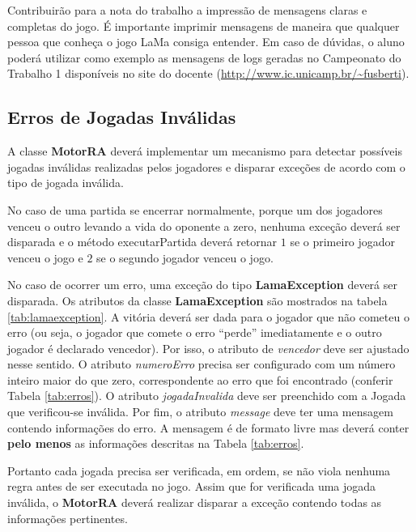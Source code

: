 \documentclass[10pt]{article}
\begin{document}
Contribuirão para a nota do trabalho a impressão de mensagens claras e completas do jogo. É importante imprimir mensagens de maneira que qualquer pessoa que conheça o jogo LaMa consiga entender. Em caso de dúvidas, o aluno poderá utilizar como exemplo as mensagens de logs geradas no Campeonato do Trabalho 1 disponíveis no site do docente (\url{http://www.ic.unicamp.br/~fusberti}).

\subsection{Erros de Jogadas Inválidas} \label{sec:excecoes}

A classe \textbf{MotorRA} deverá implementar um mecanismo para detectar possíveis jogadas inválidas realizadas pelos jogadores e disparar exceções de acordo com o tipo de jogada inválida.

No caso de uma partida se encerrar normalmente, porque um dos jogadores venceu o outro levando a vida do oponente a zero, nenhuma exceção deverá ser disparada e o método executarPartida deverá retornar $1$ se o primeiro jogador venceu o jogo e $2$ se o segundo jogador venceu o jogo.

No caso de ocorrer um erro, uma exceção do tipo \textbf{LamaException} deverá ser disparada. Os atributos da classe \textbf{LamaException} são mostrados na tabela \ref{tab:lamaexception}. A vitória deverá ser dada para o jogador que não cometeu o erro (ou seja, o jogador que comete o erro ``perde'' imediatamente e o outro jogador é declarado vencedor). Por isso, o atributo de \textit{vencedor} deve ser ajustado nesse sentido. O atributo \textit{numeroErro} precisa ser configurado com um número inteiro maior do que zero, correspondente ao erro que foi encontrado (conferir Tabela \ref{tab:erros}). O atributo \textit{jogadaInvalida} deve ser preenchido com a Jogada que verificou-se inválida. Por fim, o atributo \textit{message} deve ter uma mensagem contendo informações do erro. A mensagem é de formato livre mas deverá conter \textbf{pelo menos} as informações descritas na Tabela \ref{tab:erros}.

Portanto cada jogada precisa ser verificada, em ordem, se não viola nenhuma regra antes de ser executada no jogo. Assim que for verificada uma jogada inválida, o \textbf{MotorRA} deverá realizar disparar a exceção contendo todas as informações pertinentes.
\end{document}
